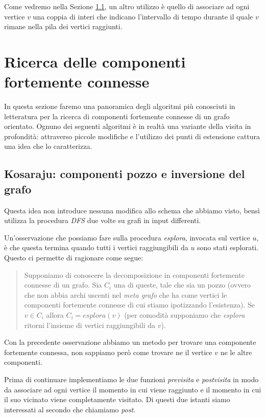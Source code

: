 Come vedremo nella Sezione \ref{subsection:kosaraju-algorithm}, un
altro utilizzo \`e quello di associare ad ogni vertice $v$ una coppia
di interi che indicano l'intervallo di tempo durante il quale $v$
rimane nella pila dei vertici raggiunti.

\section{Ricerca delle componenti fortemente connesse}

In questa sezione faremo una panoramica degli algoritmi pi\`u
conosciuti in letteratura per la ricerca di componenti fortemente
connesse di un grafo orientato. Ognuno dei seguenti algoritmi \`e in
realt\`a una variante della visita in profondit\`a: attraverso piccole
modifiche e l'utilizzo dei punti di estensione cattura una idea che lo
caratterizza.

\subsection{Kosaraju: componenti pozzo e inversione del grafo}
\label{subsection:kosaraju-algorithm}
Questa idea non introduce nessuna modifica allo schema che abbiamo
visto, bens\`i utilizza la procedura \emph{DFS} due volte su grafi in
input differenti.

Un'osservazione che possiamo fare sulla procedura \emph{esplora},
invocata sul vertice $u$, \`e che questa termina quando tutti i
vertici raggiungibili da $u$ sono stati esplorati. Questo ci permette
di ragionare come segue:
\begin{quotation}
  Supponiamo di conoscere la decomposizione in componenti fortemente
  connesse di un grafo. Sia $C_{i}$ una di queste, tale che sia un
  pozzo (ovvero che non abbia archi uscenti nel \emph{meta grafo} che
  ha come vertici le componenti fortemente connesse di cui stiamo
  ipotizzando l'esistenza). Se $v \in C_{i}$ allora $C_{i} =
  esplora(v)$ (per comodit\`a supponiamo che \emph{esplora} ritorni
  l'insieme di vertici raggiungibili da $v$).
\end{quotation}

Con la precedente osservazione abbiamo un metodo per trovare una
componente fortemente connessa, non sappiamo per\`o come trovare ne il
vertice $v$ ne le altre componenti.

Prima di continuare implementiamo le due funzioni \emph{previsita} e
\emph{postvisita} in modo da associare ad ogni vertice il momento in
cui viene raggiunto e il momento in cui il suo vicinato viene
completamente visitato. Di questi due istanti siamo interessati al
secondo che chiamiamo \emph{post}.

